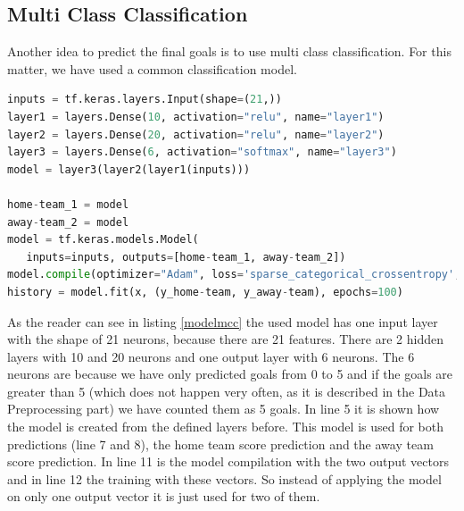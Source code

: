 \begin{table}
\centering
{}
\caption{ Quality Model for Away Team and Home Team}
\label{table:qualitymodelregression}
\end{table}

\subsection{Multi Class Classification}
Another idea to predict the final goals is to use multi class classification. For this matter, we have used a common classification model.

\begin{lstlisting}[language=Python, caption=Python code for multi class classification, label=modelmcc]
inputs = tf.keras.layers.Input(shape=(21,))
layer1 = layers.Dense(10, activation="relu", name="layer1")
layer2 = layers.Dense(20, activation="relu", name="layer2")
layer3 = layers.Dense(6, activation="softmax", name="layer3")
model = layer3(layer2(layer1(inputs)))

home-team_1 = model
away-team_2 = model
model = tf.keras.models.Model(
   inputs=inputs, outputs=[home-team_1, away-team_2])
model.compile(optimizer="Adam", loss='sparse_categorical_crossentropy', metrics=[ "acc"])
history = model.fit(x, (y_home-team, y_away-team), epochs=100)
\end{lstlisting}

As the reader can see in listing \ref{modelmcc} the used model has one input layer with the shape of 21 neurons, because there are 21 features. There are 2 hidden layers with 10 and 20 neurons and one output layer with 6 neurons. The 6 neurons are because we have only predicted goals from 0 to 5 and if the goals are greater than 5 (which does not happen very often, as it is described in the Data Preprocessing part) we have counted them as 5 goals. In line 5 it is shown how the model is created from the defined layers before. This model is used for both predictions (line 7 and 8), the home team score prediction and the away team score prediction. In line 11 is the model compilation with the two output vectors and in line 12 the training with these vectors. So instead of applying the model on only one output vector it is just used for two of them. 

